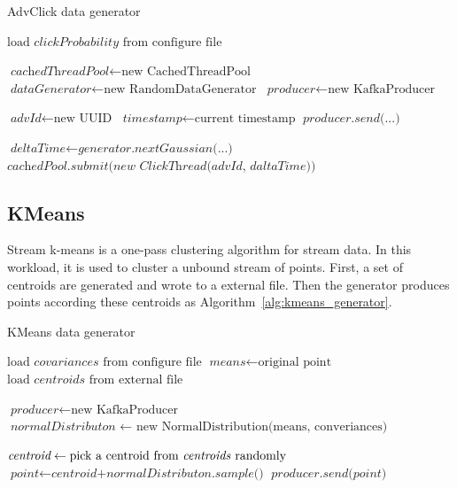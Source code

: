 \begin{algorithm}
\caption{AdvClick data generator}\label{euclid}
\label{alg:advclick_generator}
\begin{algorithmic}[1]
\State $\text{load } \textit{clickProbability} \text{ from configure file}$

\State $\textit{cachedThreadPool} \gets \text{new CachedThreadPool}$
\State $\textit{dataGenerator} \gets \text{new RandomDataGenerator}$ 
\State $\textit{producer} \gets \text{new KafkaProducer}$ 

\State $\textit{advId} \gets \text{new UUID}$ 
\State $\textit{timestamp} \gets \text{current timestamp}$ 
\State $\textit{producer.send(...)}$ 

\State $\textit{deltaTime} \gets \textit{generator.nextGaussian(...)}$ 
\State $\textit{cachedPool.submit(new ClickThread(advId, daltaTime))} $ 
\EndIf
\EndWhile
\end{algorithmic}
\end{algorithm}

\subsection{KMeans}

Stream k-means is a one-pass clustering algorithm for stream data. In this workload, it is used to cluster a unbound stream of points. First, a set of centroids are generated and wrote to a external file. Then the generator produces points according these centroids as Algorithm~\ref{alg:kmeans_generator}.

\begin{algorithm}
\caption{KMeans data generator}\label{euclid}
\label{alg:kmeans_generator}
\begin{algorithmic}[1]
\State $\text{load } \textit{covariances} \text{ from configure file}$
\State $\textit{means} \gets \text{original point}$
\State $\text{load } \textit{centroids} \text{ from external file}$

\State $\textit{producer} \gets \text{new KafkaProducer}$ 
\State $\textit{normalDistributon } \gets \text{ new NormalDistribution(means, converiances)}$

\State $\textit{centroid} \gets \text{pick a centroid from \textit{centroids} randomly}$ 
\State $\textit{point} \gets \textit{centroid+normalDistributon.sample()}$ 
\State $\textit{producer.send(point)}$ 

\EndWhile
\end{algorithmic}
\end{algorithm}


